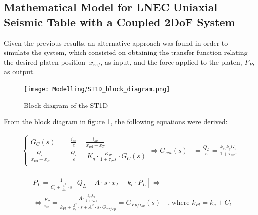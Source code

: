 \documentclass[9pt]{extarticle}
\begin{document}

\subsection{Mathematical Model for LNEC Uniaxial Seismic Table with a Coupled 2DoF System}

Given the previous results, an alternative approach was found in order to simulate the system, which consisted on obtaining the transfer function relating the desired platen position, $x_{ref}$, as input, and the force applied to the platen, $F_P$, as output.

\begin{figure}[H]
    \centering
    \texttt{[image: Modelling/ST1D\_block\_diagram.png]}
    \caption{Block diagram of the ST1D}%
    \label{fig_clean_block_force_output}
\end{figure}

From the block diagram in figure \ref{fig_clean_block_force_output}, the following equations were derived:


\begin{align}
\left\{
    \begin{aligned}
        G_C(s) &= \frac{i_{sv}}{e} = \frac{i_{sv}}{x_{\text{ref}} - x_T} \\
        \frac{Q_L}{x_{\text{ref}} - x_T} &= \frac{Q_L}{e} = K_q \cdot \frac{K_{\text{sv}}}{1 + \tau_{\text{sv}} s} \cdot G_C(s) \\
    \end{aligned}
\right.
\Longrightarrow G_{csv}(s) &=  \frac{Q_L}{e} = \frac{k_{sv} k_q G_c}{1 + \tau_{sv} s} 
\end{align}

\begin{align}\label{eq_G_Fp_isv}
    \begin{aligned}
    & P_L = \frac{1}{C_l + \frac{A^2}{k_h}\cdot s} [Q_L - A \cdot s \cdot x_T - k_c \cdot P_L] \Longleftrightarrow \\
    & \Longleftrightarrow \frac{F_P}{i_{sv}} = \frac{A \cdot \frac{k_{sv} k_q}{1 + \tau_{sv} s} } {  k_{Pl} + \frac{A^2}{k_h}\cdot s  + A^2\cdot s \cdot G_{xT/Fp}} = G_{Fp/i_{sv}}(s) \quad \text{, where $k_{Pl}=k_c + C_l$}
    \end{aligned}
\end{align}
\end{document}
